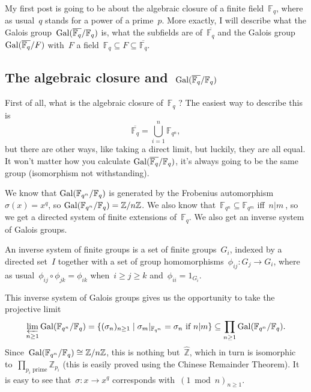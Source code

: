 My first post is going to be about the algebraic closure of a finite field~$\mathbb{F}_q$, where as usual~$q$ stands for a power of a prime~$p$. More exactly, I will describe what the Galois group~$\operatorname{Gal}(\overline{\mathbb{F}_q}/\mathbb{F}_q)$ is, what the subfields are of~$\overline{\mathbb{F}_q}$ and the Galois group~$\operatorname{Gal}(\overline{\mathbb{F}_q}/F)$ with~$F$ a field~$\mathbb{F}_q \subseteq F \subseteq \overline{\mathbb{F}_q}$.

\subsection{The algebraic closure and~$\operatorname{Gal}(\overline{\mathbb{F}_q}/\mathbb{F}_q)$}
First of all, what is the algebraic closure of~$\mathbb{F}_q$ ? The easiest way to describe this is
\begin{equation}
  \overline{\mathbb{F}_q} = \bigcup_{i=1}^n \mathbb{F}_{q^n}, 
\end{equation}
but there are other ways, like taking a direct limit, but luckily, they are all equal. It won't matter how you calculate $\operatorname{Gal}(\overline{\mathbb{F}_q}/\mathbb{F}_q)$, it's always going to be the same group (isomorphism not withstanding).

We know that $\operatorname{Gal}(\mathbb{F}_{q^n}/\mathbb{F}_q)$ is generated by the Frobenius automorphism~$\sigma(x) = x^q$, so $\operatorname{Gal}(\mathbb{F}_{q^n}/\mathbb{F}_q) = \mathbb{Z}/n\mathbb{Z}$. We also know that~$\mathbb{F}_{q^n} \subseteq \mathbb{F}_{q^m}$ iff~$n |m~$, so we get a directed system of finite extensions of~$\mathbb{F}_q$. We also get an inverse system of Galois groups.

\begin{definition}
  An inverse system of finite groups is a set of finite groups~$G_i$, indexed by a directed set~$I$ together with a set of group homomorphisms~$\phi_{ij}:G_j \rightarrow G_i$, where as usual~$\phi_{ij} \circ \phi_{jk} = \phi_{ik}$ when~$i \geq j \geq k$ and~$\phi_{ii} = 1_{G_i}$.
\end{definition}

This inverse system of Galois groups gives us the opportunity to take the projective limit
\begin{equation}
  \varprojlim_{n \geq 1} \operatorname{Gal}(\mathbb{F}_{q^n}/\mathbb{F}_q) = \{ (\sigma_{n})_{n \geq 1} \mid \sigma_m|_{\mathbb{F}_{q^n}} = \sigma_{n} \text{ if } n|m \} \subseteq \prod_{n \geq 1} \operatorname{Gal}(\mathbb{F}_{q^n}/\mathbb{F}_q). 
\end{equation}
Since~$\operatorname{Gal}(\mathbb{F}_{q^n}/\mathbb{F}_q) \cong\mathbb{Z}/n\mathbb{Z}$, this is nothing but~$\widehat{\mathbb{Z}}$, which in turn is isomorphic to~$\prod_{p_{i} \text{ prime}} \mathbb{Z}_{p_{i}}$ (this is easily proved using the Chinese Remainder Theorem). It is easy to see that~$\sigma:x \rightarrow x^q$ corresponds with~$(1 \bmod n)_{n \geq 1}$.

